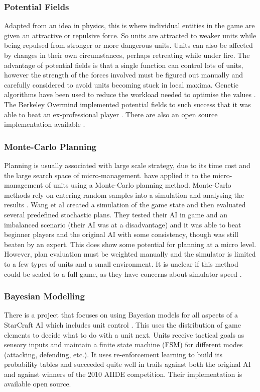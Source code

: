 \documentclass[11pt,openright,a4paper]{report}
\begin{document}
\subsubsection{Potential Fields}
Adapted from an idea in physics, this is where individual entities in the game are given an attractive or repulsive force. So units are attracted to weaker units while being repulsed from stronger or more dangerous units. Units can also be affected by changes in their own circumstances, perhaps retreating while under fire. The advantage of potential fields is that a single function can control lots of units, however the strength of the forces involved must be figured out manually and carefully considered to avoid units becoming stuck in local maxima. Genetic algorithms have been used to reduce the workload needed to optimise the values \cite{rathe2012micromanagement}. The Berkeley Overmind \cite{BerkeleyOvermind} implemented potential fields to such success that it was able to beat an ex-professional player \cite{OvermindArticle}. There are also an open source implementation available \cite{AIBot}.

\subsubsection{Monte-Carlo Planning}
Planning is usually associated with large scale strategy, due to its time cost and the large search space of micro-management.  have applied it to the micro-management of units using a Monte-Carlo planning method. Monte-Carlo methods rely on entering random samples into a simulation and analysing the results \cite{MonteCarlo}. Wang et al created a simulation of the game state and then evaluated several predefined stochastic plans. They tested their AI in game and an imbalanced scenario (their AI was at a disadvantage) and it was able to beat beginner players and the original AI with some consistency, though was still beaten by an expert. This does show some potential for planning at a micro level. However, plan evaluation must be weighted manually and the simulator is limited to a few types of units and a small environment. It is unclear if this method could be scaled to a full game, as they have concerns about simulator speed .

\subsubsection{Bayesian Modelling}
There is a project that focuses on using Bayesian models for all aspects of a StarCraft AI \cite{synnaeve2012bayesian} which includes unit control \cite{synnaeve2011bayesian}. This uses the distribution of game elements to decide what to do with a unit next. Units receive tactical goals as sensory inputs and maintain a finite state machine (FSM) for different modes (attacking, defending, etc.). It uses re-enforcement learning to build its probability tables and succeeded quite well in trails against both the original AI and against winners of the 2010 AIIDE competition. Their implementation is available open source.
\end{document}
